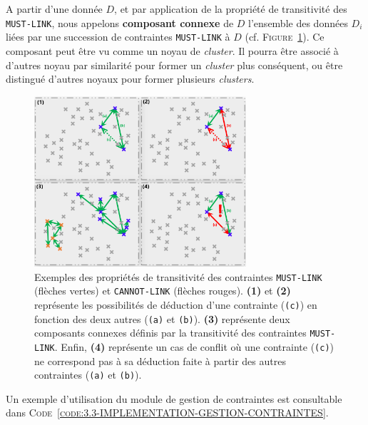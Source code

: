		A partir d'une donnée \(D\), et par application de la propriété de transitivité des \texttt{MUST-LINK}, nous appelons \textbf{composant connexe} de \(D\) l'ensemble des données \(D_i\) liées par une succession de contraintes \texttt{MUST-LINK} à \(D\) (cf. \textsc{Figure~\ref{figure:3.3-CONTRAINTES-TRANSITIVITE}}).
		Ce composant peut être vu comme un noyau de \textit{cluster}.
		Il pourra être associé à d'autres noyau par similarité pour former un \textit{cluster} plus conséquent, ou être distingué d'autres noyaux pour former plusieurs \textit{clusters}.

		\begin{figure}[!htb]
			\centering
			\includegraphics[width=0.7\textwidth]{figures/example-constraints-transitivity}
			\caption{Exemples des propriétés de transitivité des contraintes \texttt{MUST-LINK} (flèches vertes) et \texttt{CANNOT-LINK} (flèches rouges). \textbf{(1)} et \textbf{(2)} représente les possibilités de déduction d'une contrainte (\texttt{(c)}) en fonction des deux autres (\texttt{(a)} et \texttt{(b)}). \textbf{(3)} représente deux composants connexes définis par la transitivité des contraintes \texttt{MUST-LINK}. Enfin, \textbf{(4)} représente un cas de conflit où une contrainte (\texttt{(c)}) ne correspond pas à sa déduction faite à partir des autres contraintes (\texttt{(a)} et \texttt{(b)}).}
			\label{figure:3.3-CONTRAINTES-TRANSITIVITE}
		\end{figure}
		
		Un exemple d'utilisation du module de gestion de contraintes est consultable dans \textsc{Code~\ref{code:3.3-IMPLEMENTATION-GESTION-CONTRAINTES}}.
		

